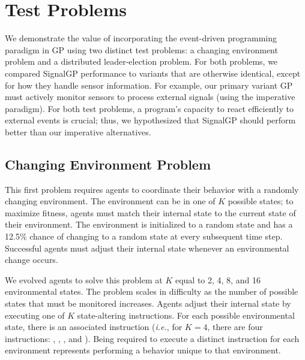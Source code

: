 \section{Test Problems}
\label{chapter:signalgp:sec:test-problems}

We demonstrate the value of incorporating the event-driven programming paradigm in GP using two distinct test problems: a changing environment problem and a distributed leader-election problem. 
For both problems, we compared SignalGP performance to variants that are otherwise identical, except for how they handle sensor information. 
For example, our primary variant GP must actively monitor sensors to process external signals (using the imperative paradigm).
For both test problems, a program's capacity to react efficiently to external events is crucial; thus, we hypothesized that SignalGP should perform better than our imperative alternatives.  

\subsection{Changing Environment Problem}

This first problem requires agents to coordinate their behavior with a randomly changing environment. 
The environment can be in one of $K$ possible states; to maximize fitness, agents must match their internal state to the current state of their environment. 
The environment is initialized to a random state and has a 12.5\% chance of changing to a random state at every subsequent time step.
Successful agents must adjust their internal state whenever an environmental change occurs. 

We evolved agents to solve this problem at $K$ equal to 2, 4, 8, and 16 environmental states. 
The problem scales in difficulty as the number of possible states that must be monitored increases. 
Agents adjust their internal state by executing one of $K$ state-altering instructions.
For each possible environmental state, there is an associated  instruction
(\textit{i.e.}, for $K=4$, there are four instructions: , , , and ).
Being required to execute a distinct instruction for each environment represents performing a behavior unique to that environment. 

